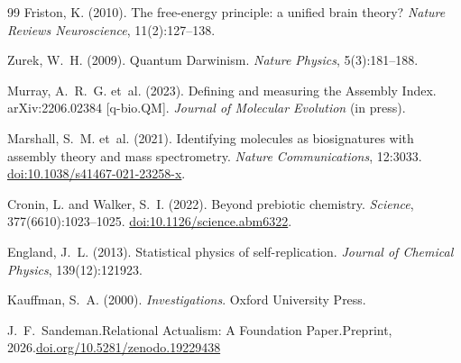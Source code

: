 \documentclass[11pt,a4paper]{article}
\theoremstyle{plain}
\theoremstyle{definition}
\theoremstyle{remark}
\begin{document}
\begin{thebibliography}{99}
Friston, K. (2010).
\newblock The free-energy principle: a unified brain theory?
\newblock \emph{Nature Reviews Neuroscience}, 11(2):127--138.

Zurek, W.~H. (2009).
\newblock Quantum Darwinism.
\newblock \emph{Nature Physics}, 5(3):181--188.

Murray, A.~R.~G. et~al. (2023).
\newblock Defining and measuring the Assembly Index.
\newblock arXiv:2206.02384 [q-bio.QM]. \emph{Journal of Molecular Evolution} (in press).

Marshall, S.~M. et~al. (2021).
\newblock Identifying molecules as biosignatures with assembly theory and mass spectrometry.
\newblock \emph{Nature Communications}, 12:3033.
\newblock \href{https://doi.org/10.1038/s41467-021-23258-x}{doi:10.1038/s41467-021-23258-x}.

Cronin, L. and Walker, S.~I. (2022).
\newblock Beyond prebiotic chemistry.
\newblock \emph{Science}, 377(6610):1023--1025.
\newblock \href{https://doi.org/10.1126/science.abm6322}{doi:10.1126/science.abm6322}.

England, J.~L. (2013).
\newblock Statistical physics of self-replication.
\newblock \emph{Journal of Chemical Physics}, 139(12):121923.

Kauffman, S.~A. (2000).
\newblock \emph{Investigations}.
\newblock Oxford University Press.

J.~F.~Sandeman.\newblock Relational Actualism: A Foundation Paper.\newblock Preprint, 2026.\newblock \href{https://doi.org/10.5281/zenodo.19229438}{doi.org/10.5281/zenodo.19229438}

\end{thebibliography}
\end{document}
